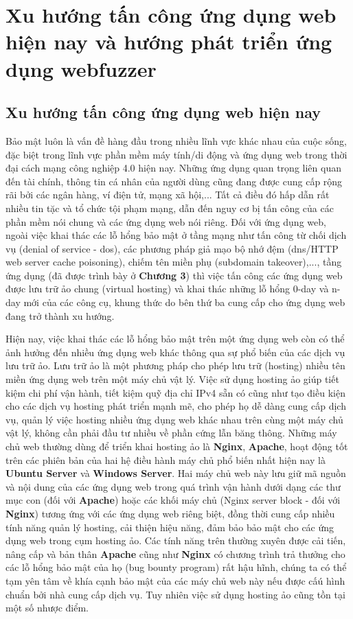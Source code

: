 \chapter{Xu hướng tấn công ứng dụng web hiện nay và hướng phát triển ứng dụng webfuzzer}
\section{Xu hướng tấn công ứng dụng web hiện nay}
Bảo mật luôn là vấn đề hàng đầu trong nhiều lĩnh vực khác nhau của cuộc sống, đặc biệt trong lĩnh vực phần mềm máy tính/di động và ứng dụng web trong thời đại cách mạng công nghiệp 4.0 hiện nay. Những ứng dụng quan trọng liên quan đến tài chính, thông tin cá nhân của người dùng cũng đang được cung cấp rộng rãi bởi các ngân hàng, ví điện tử, mạng xã hội,... Tất cả điều đó hấp dẫn rất nhiều tin tặc và tổ chức tội phạm mạng, dẫn đến nguy cơ bị tấn công của các phần mềm nói chung và các ứng dụng web nói riêng. Đối với ứng dụng web, ngoài việc khai thác các lỗ hổng bảo mật ở tầng mạng như tấn công từ chối dịch vụ (denial of service - \acrshort{dos}), các phương pháp giả mạo bộ nhớ đệm (\acrshort{dns}/HTTP web server cache poisoning), chiếm tên miền phụ (subdomain takeover),..., tầng ứng dụng (đã được trình bày ở \textbf{Chương 3}) thì việc tấn công các ứng dụng web được lưu trữ ảo chung (virtual hosting) và khai thác những lỗ hổng 0-day và n-day mới của các công cụ, khung thức do bên thứ ba cung cấp cho ứng dụng web đang trở thành xu hướng. \par
Hiện nay, việc khai thác các lỗ hổng bảo mật trên một ứng dụng web còn có thể ảnh hưởng đến nhiều ứng dụng web khác thông qua sự phổ biến của các dịch vụ lưu trữ ảo. Lưu trữ ảo là một phương pháp cho phép lưu trữ (hosting) nhiều tên miền ứng dụng web trên một máy chủ vật lý. Việc sử dụng hosting ảo giúp tiết kiệm chi phí vận hành, tiết kiệm quỹ địa chỉ IPv4 sẵn có cũng như tạo điều kiện cho các dịch vụ hosting phát triển mạnh mẽ, cho phép họ dễ dàng cung cấp dịch vụ, quản lý việc hosting nhiều ứng dụng web khác nhau trên cùng một máy chủ vật lý, không cần phải đầu tư nhiều về phần cứng lẫn băng thông. Những máy chủ web thường dùng để triển khai hosting ảo là \textbf{Nginx}, \textbf{Apache}, hoạt động tốt trên các phiên bản của hai hệ điều hành máy chủ phổ biến nhất hiện nay là \textbf{Ubuntu Server} và \textbf{Windows Server}. Hai máy chủ web này lưu giữ mã nguồn và nội dung của các ứng dụng web trong quá trình vận hành dưới dạng các thư mục con (đối với \textbf{Apache}) hoặc các khối máy chủ (Nginx server block - đối với \textbf{Nginx}) tương ứng với các ứng dụng web riêng biệt, đồng thời cung cấp nhiều tính năng quản lý hosting, cải thiện hiệu năng, đảm bảo bảo mật cho các ứng dụng web trong cụm hosting ảo. Các tính năng trên thường xuyên được cải tiến, nâng cấp và bản thân \textbf{Apache} cũng như \textbf{Nginx} có chương trình trả thưởng cho các lỗ hổng bảo mật của họ (bug bounty program) rất hậu hĩnh, chúng ta có thể tạm yên tâm về khía cạnh bảo mật của các máy chủ web này nếu được cấú hình chuẩn bởi nhà cung cấp dịch vụ. Tuy nhiên việc sử dụng hosting ảo cũng tồn tại một số nhược điểm.
